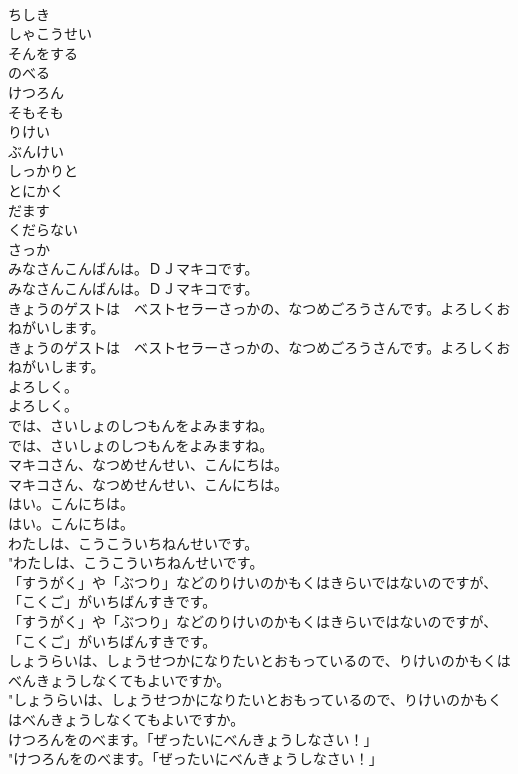 \documentclass[8pt]{extreport}
\begin{document}
\begin{CJK}{UTF8}{min}
\\	ちしき
\\	しゃこうせい
\\	そんをする
\\	のべる
\\	けつろん
\\	そもそも
\\	りけい
\\	ぶんけい
\\	しっかりと
\\	とにかく
\\	だます
\\	くだらない
\\	さっか
\\	みなさんこんばんは。ＤＪマキコです。	
\\	みなさんこんばんは。ＤＪマキコです。 
\\	きょうのゲストは　ベストセラーさっかの、なつめごろうさんです。よろしくおねがいします。	
\\	きょうのゲストは　ベストセラーさっかの、なつめごろうさんです。よろしくおねがいします。 
\\	よろしく。	
\\	よろしく。 
\\	では、さいしょのしつもんをよみますね。	
\\	では、さいしょのしつもんをよみますね。 
\\	マキコさん、なつめせんせい、こんにちは。	
\\	マキコさん、なつめせんせい、こんにちは。 
\\	はい。こんにちは。	
\\	はい。こんにちは。 
\\	わたしは、こうこういちねんせいです。	
\\	"わたしは、こうこういちねんせいです。 
\\	「すうがく」や「ぶつり」などのりけいのかもくはきらいではないのですが、「こくご」がいちばんすきです。	
\\	「すうがく」や「ぶつり」などのりけいのかもくはきらいではないのですが、「こくご」がいちばんすきです。 
\\	しょうらいは、しょうせつかになりたいとおもっているので、りけいのかもくはべんきょうしなくてもよいですか。	
\\	"しょうらいは、しょうせつかになりたいとおもっているので、りけいのかもくはべんきょうしなくてもよいですか。 
\\	けつろんをのべます。「ぜったいにべんきょうしなさい！」	
\\	"けつろんをのべます。「ぜったいにべんきょうしなさい！」 

\end{CJK}
\end{document}
